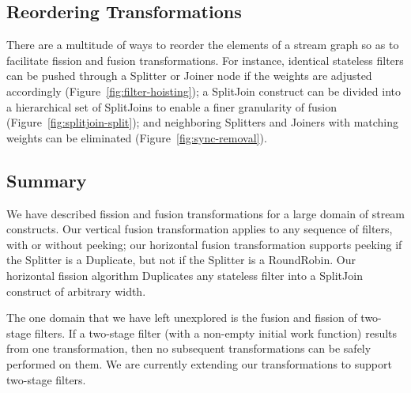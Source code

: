 \subsection{Reordering Transformations}
There are a multitude of ways to reorder the elements of a stream
graph so as to facilitate fission and fusion transformations.  For
instance, identical stateless filters can be pushed through a Splitter
or Joiner node if the weights are adjusted accordingly
(Figure~\ref{fig:filter-hoisting}); a SplitJoin construct can be
divided into a hierarchical set of SplitJoins to enable a finer
granularity of fusion (Figure~\ref{fig:splitjoin-split}); and
neighboring Splitters and Joiners with matching weights can be
eliminated (Figure~\ref{fig:sync-removal}).

\subsection{Summary}

We have described fission and fusion transformations for a large
domain of stream constructs.  Our vertical fusion transformation
applies to any sequence of filters, with or without peeking; our
horizontal fusion transformation supports peeking if the Splitter is a
Duplicate, but not if the Splitter is a RoundRobin.  Our horizontal
fission algorithm Duplicates any stateless filter into a SplitJoin
construct of arbitrary width.

The one domain that we have left unexplored is the fusion and fission
of two-stage filters.  If a two-stage filter (with a non-empty initial
work function) results from one transformation, then no subsequent
transformations can be safely performed on them.  We are currently
extending our transformations to support two-stage filters.



